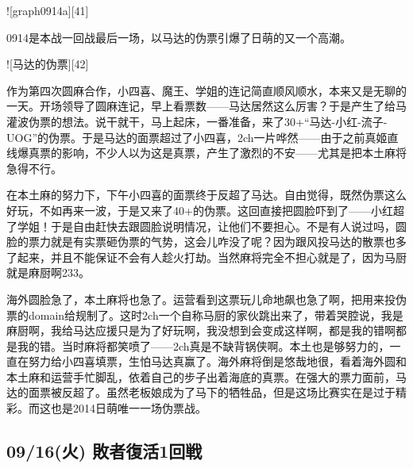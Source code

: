 ![graph0914a][41]

0914是本战一回战最后一场，以马达的伪票引爆了日萌的又一个高潮。

![马达的伪票][42]

作为第四次圆麻合作，小四喜、魔王、学姐的连记简直顺风顺水，本来又是无聊的一天。开场领导了圆麻连记，早上看票数——马达居然这么厉害？于是产生了给马灌波伪票的想法。说干就干，马上起床，一番准备，来了30+“马达-小红-流子-UOG”的伪票。于是马达的面票超过了小四喜，2ch一片哗然——由于之前真姬直线爆真票的影响，不少人以为这是真票，产生了激烈的不安——尤其是把本土麻将急得不行。

在本土麻的努力下，下午小四喜的面票终于反超了马达。自由觉得，既然伪票这么好玩，不如再来一波，于是又来了40+的伪票。这回直接把圆脸吓到了——小红超了学姐！于是自由赶快去跟圆脸说明情况，让他们不要担心。不是有人说过吗，圆脸的票力就是有实票砸伪票的气势，这会儿咋没了呢？因为跟风投马达的散票也多了起来，并且不能保证不会有人趁火打劫。当然麻将完全不担心就是了，因为马厨就是麻厨啊233。

海外圆脸急了，本土麻将也急了。运营看到这票玩儿命地飙也急了啊，把用来投伪票的domain给规制了。这时2ch一个自称马厨的家伙跳出来了，带着哭腔说，我是麻厨啊，我给马达应援只是为了好玩啊，我没想到会变成这样啊，都是我的错啊都是我的错。当时麻将都笑喷了——2ch真是不缺背锅侠啊。本土也是够努力的，一直在努力给小四喜填票，生怕马达真赢了。海外麻将倒是悠哉地很，看着海外圆和本土麻和运营手忙脚乱，依着自己的步子出着海底的真票。在强大的票力面前，马达的面票被反超了。虽然老板娘成为了马下的牺牲品，但是这场比赛实在是过于精彩。而这也是2014日萌唯一一场伪票战。

\subsection{09/16(火) 敗者復活1回戦}


